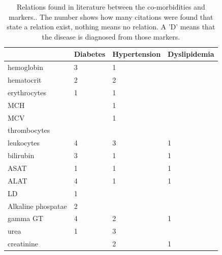 \documentclass[10pt,a4paper]{report}
\begin{document}
	\begin{table}[]
		\centering
		\caption{Relations found in literature between the co-morbidities and markers.\cite{Deneer2017Thesis}. The number shows how many citations were found that state a relation exist, nothing means no relation. A 'D' means that the disease is diagnosed from those markers.}
		\label{tab:CoMorMarkRel}
		\begin{tabular}{llll}
			\hline
			& \textbf{Diabetes} & \textbf{Hypertension} & \textbf{Dyslipidemia} \\ \hline
			hemoglobin            & 3                 & 1                     &                       \\
			hematocrit            & 2                 & 2                     &                       \\
			erythrocytes          & 1                 & 1                     &                       \\
			MCH                   &                   & 1                     &                       \\
			MCV                   &                   & 1                     &                       \\
			thrombocytes          &                   &                       &                       \\
			leukocytes            & 4                 & 3                     & 1                     \\
			bilirubin             & 3                 & 1                     & 1                     \\
			ASAT                  & 1                 & 1                     & 1                     \\
			ALAT                  & 4                 & 1                     & 1                     \\
			LD                    & 1                 &                       &                       \\
			Alkaline phospatae    & 2                 &                       &                       \\
			gamma GT              & 4                 & 2                     & 1                     \\
			urea                  & 1                 & 3                     &                       \\
			creatinine            &                   & 2                     & 1                     \\

\end{tabular}
\end{table}
\end{document}
